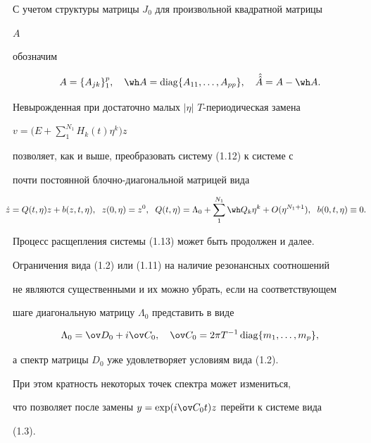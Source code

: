  


С учетом структуры матрицы $J_0$ для произвольной квадратной матрицы 


$A$ 


обозначим 


$$ 


A=\{A_{j k}\}^p_1,\quad 


\wh A=\diag\{A_{11},\dotsc,A_{p p}\},\quad 


\Hat{\Hat A}=A-\wh A. 


$$ 


Невырожденная при достаточно малых $|\eta|$\; $T$-периодическая замена  


$v=\Big(E+\sum\limits^{N_1}_1 H_k(t)\eta^k\Big)z$ 


позволяет, как и выше, преобразовать систему (1.12) к системе с  


почти постоянной блочно-диагональной матрицей вида 


\begin{equation} 


\hspace{-3mm}\Dot z=Q(t,\eta)z+b(z,t,\eta),\ \; z(0,\eta)=z^0, 


\ \; Q(t,\eta)=\Lambda_0+\sum^{N_1}_1\wh Q_k\eta^k+ 


O(\eta^{N_1+1}),\ \; b(0,t,\eta)\equiv0. 


\end{equation} 


Процесс расщепления системы (1.13) может быть продолжен и далее.  


 


\begin{notes} 


Ограничения вида (1.2) или (1.11) на наличие резонансных соотношений 


не являются существенными и их можно убрать, если на соответствующем 


шаге диагональную матрицу $\Lambda_0$ представить в виде 


$$ 


\Lambda_0=\ov D_0+i\ov C_0,\quad 


\ov C_0=2\pi T^{-1}\diag\{m_1,\dotsc,m_p\}, 


$$ 


а спектр матрицы $D_0$ уже удовлетворяет условиям вида (1.2). 


При этом кратность некоторых точек спектра может измениться,  


что позволяет после замены $y=\exp(i\ov C_0t)z$ перейти к системе вида 


(1.3). 


\end{notes} 


